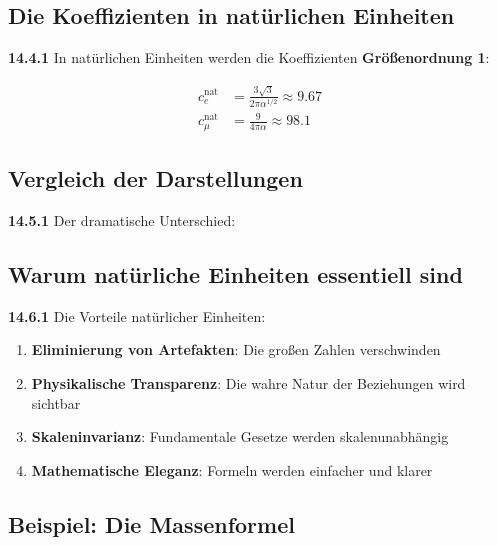 \subsection{Die Koeffizienten in natürlichen Einheiten}

\noindent \textbf{14.4.1} In natürlichen Einheiten werden die Koeffizienten \textbf{Größenordnung 1}:

\begin{align*}
	c_e^{\text{nat}} &= \frac{3\sqrt{3}}{2\pi\alpha^{1/2}} \approx 9.67 \\
	c_\mu^{\text{nat}} &= \frac{9}{4\pi\alpha} \approx 98.1
\end{align*}

\subsection{Vergleich der Darstellungen}

\noindent \textbf{14.5.1} Der dramatische Unterschied:


\subsection{Warum natürliche Einheiten essentiell sind}

\noindent \textbf{14.6.1} Die Vorteile natürlicher Einheiten:
\begin{enumerate}
	\item \textbf{Eliminierung von Artefakten}: Die großen Zahlen verschwinden
	\item \textbf{Physikalische Transparenz}: Die wahre Natur der Beziehungen wird sichtbar
	\item \textbf{Skaleninvarianz}: Fundamentale Gesetze werden skalenunabhängig
	\item \textbf{Mathematische Eleganz}: Formeln werden einfacher und klarer
\end{enumerate}

\subsection{Beispiel: Die Massenformel}

